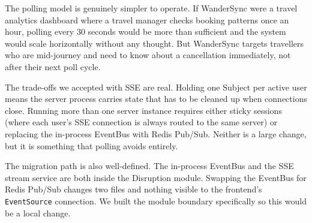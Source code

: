 \documentclass[12pt,a4paper]{article}
\begin{document}
The polling model is genuinely simpler to operate. If WanderSync were a travel analytics
dashboard where a travel manager checks booking patterns once an hour, polling every 30 seconds
would be more than sufficient and the system would scale horizontally without any thought. But
WanderSync targets travellers who are mid-journey and need to know about a cancellation
immediately, not after their next poll cycle.

The trade-offs we accepted with SSE are real. Holding one Subject per active user means the
server process carries state that has to be cleaned up when connections close. Running more than
one server instance requires either sticky sessions (where each user's SSE connection is always
routed to the same server) or replacing the in-process EventBus with Redis Pub/Sub. Neither is
a large change, but it is something that polling avoids entirely.

The migration path is also well-defined. The in-process EventBus and the SSE stream service are
both inside the Disruption module. Swapping the EventBus for Redis Pub/Sub changes two files and
nothing visible to the frontend's \texttt{EventSource} connection. We built the module boundary
specifically so this would be a local change.
\end{document}

